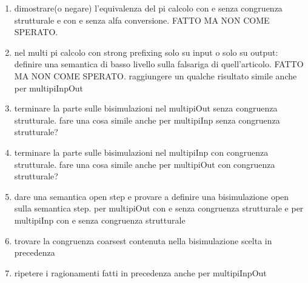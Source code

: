 




\begin{enumerate}
  \item
    dimostrare(o negare) l'equivalenza del pi calcolo con e senza congruenza strutturale e con e senza alfa conversione. FATTO MA NON COME SPERATO.
  \item
    nel multi pi calcolo con strong prefixing solo su input o solo su output: definire una semantica di basso livello sulla falsariga di quell'articolo. FATTO MA NON COME SPERATO.
    raggiungere un qualche risultato simile anche per multipiInpOut
  \item
    terminare la parte sulle bisimulazioni nel multipiOut senza congruenza strutturale.
    fare una cosa simile anche per multipiInp senza congruenza strutturale?
  \item
    terminare la parte sulle bisimulazioni nel multipiInp con congruenza strutturale.
    fare una cosa simile anche per multipiOut con congruenza strutturale?
  \item
    dare una semantica open step e provare a definire una bisimulazione open sulla semantica step.
    per multipiOut con e senza congruenza strutturale e per multipiInp con e senza congruenza strutturale
  \item
    trovare la congruenza coarsest contenuta nella bisimulazione scelta in precedenza
  \item
    ripetere i ragionamenti fatti in precedenza anche per multipiInpOut
\end{enumerate}



